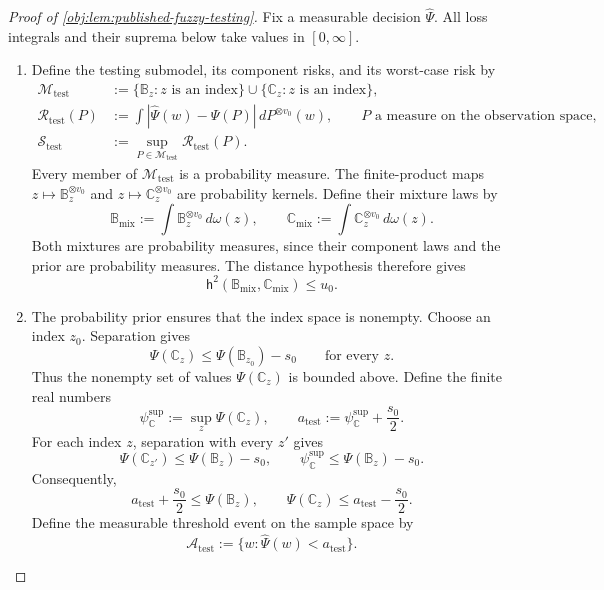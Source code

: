 \documentclass[11pt]{article}
\begin{document}
\begin{proof}[Proof of \cref{obj:lem:published-fuzzy-testing}]
Fix a measurable decision \(\widehat\Psi\). All loss integrals and their suprema below take values in \([0,\infty]\).

\begin{enumerate}
\item Define the testing submodel, its component risks, and its worst-case risk by
\[
\begin{aligned}
\mathcal M_{\mathrm{test}}
&:=\{\mathbb B_z:z\text{ is an index}\}
  \cup\{\mathbb C_z:z\text{ is an index}\},\\
\mathcal R_{\mathrm{test}}(P)
&:=\int
  |\widehat\Psi(w)-\Psi(P)|\,dP^{\otimes v_0}(w),
  \qquad P\text{ a measure on the observation space},\\
\mathcal S_{\mathrm{test}}
&:=\sup_{P\in\mathcal M_{\mathrm{test}}}
  \mathcal R_{\mathrm{test}}(P).
\end{aligned}
\]
Every member of \(\mathcal M_{\mathrm{test}}\) is a probability measure. The finite-product maps
\(z\mapsto\mathbb B_z^{\otimes v_0}\) and
\(z\mapsto\mathbb C_z^{\otimes v_0}\) are probability kernels. Define their mixture laws by
\[
\mathbb B_{\mathrm{mix}}
:=\int\mathbb B_z^{\otimes v_0}\,d\omega(z),
\qquad
\mathbb C_{\mathrm{mix}}
:=\int\mathbb C_z^{\otimes v_0}\,d\omega(z).
\]
Both mixtures are probability measures, since their component laws and the prior are probability measures. The distance hypothesis therefore gives
\[
\mathsf h^2(\mathbb B_{\mathrm{mix}},\mathbb C_{\mathrm{mix}})
\le u_0.
\]

\item The probability prior ensures that the index space is nonempty. Choose an index \(z_0\). Separation gives
\[
\Psi(\mathbb C_z)\le \Psi(\mathbb B_{z_0})-s_0
\qquad\text{for every }z.
\]
Thus the nonempty set of values \(\Psi(\mathbb C_z)\) is bounded above. Define the finite real numbers
\[
\psi_{\mathbb C}^{\mathrm{sup}}
:=\sup_z\Psi(\mathbb C_z),
\qquad
a_{\mathrm{test}}
:=\psi_{\mathbb C}^{\mathrm{sup}}+\frac{s_0}{2}.
\]
For each index \(z\), separation with every \(z'\) gives
\[
\Psi(\mathbb C_{z'})
\le\Psi(\mathbb B_z)-s_0,
\qquad
\psi_{\mathbb C}^{\mathrm{sup}}
\le\Psi(\mathbb B_z)-s_0.
\]
Consequently,
\[
a_{\mathrm{test}}+\frac{s_0}{2}
\le\Psi(\mathbb B_z),
\qquad
\Psi(\mathbb C_z)
\le a_{\mathrm{test}}-\frac{s_0}{2}.
\]
Define the measurable threshold event on the sample space by
\[
\mathcal A_{\mathrm{test}}
:=\{w:\widehat\Psi(w)<a_{\mathrm{test}}\}.
\]


\end{enumerate}
\end{proof}
\end{document}
